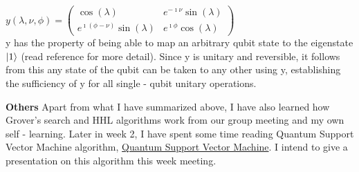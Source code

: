 \documentclass{article}
\begin{document}
$y(\lambda, \nu, \phi) = \left(\begin{matrix} \cos(\lambda) & e^{-\imath\nu}\sin(\lambda) \\
e^{\imath(\phi - \nu)}\sin(\lambda) & e^{\imath\phi}\cos(\lambda) \end{matrix} \right)$ \\

y has the property of being able to map an arbitrary qubit state to the eigenstate $\ket{1}$ (read reference for more detail). Since y is unitary and reversible, it follows from this any state of the qubit can be taken to any other using y, establishing the sufficiency of y for all single - qubit unitary operations. 

\textbf{Others}
Apart from what I have summarized above, I have also learned how Grover's search and HHL algorithms work from our group meeting and my own self - learning. Later in week 2, I have spent some time reading Quantum Support Vector Machine algorithm, \href{https://arxiv.org/abs/1307.0471}{Quantum Support Vector Machine}. I intend to give a presentation on this algorithm this week meeting. 
\end{document}
